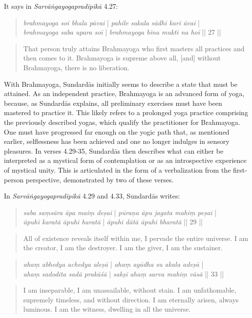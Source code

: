 It says in \textit{Sarvāṅgayogapradīpikā} 4.27:
\begin{quote}
\textit{brahmayoga soī bhala pāvai} | \textit{pahile sakala sādhi kari āvai} |\\
\textit{brahmayoga saba upara soī} | \textit{brahmayoga bina mukti na hoī} || 27 ||
\end{quote}
\begin{quote}
That person truly attains Brahmayoga who first masters all practices and then comes to it.  
Brahmayoga is supreme above all, [and] without Brahmayoga, there is no liberation.
\end{quote}

With Brahmayoga, Sundardās initially seems to describe a state that must be attained. As an independent practice, Brahmayoga is an advanced form of yoga, because, as Sundardās explains, all preliminary exercises must have been mastered to practice it. This likely refers to a prolonged yoga practice comprising the previously described yogas, which qualify the practitioner for Brahmayoga. One must have progressed far enough on the yogic path that, as mentioned earlier, selflessness has been achieved and one no longer indulges in sensory pleasures. In verses 4.29-35, Sundardās then describes what can either be interpreted as a mystical form of contemplation or as an introspective experience of mystical unity. This is articulated in the form of a verbalization from the first-person perspective, demonstrated by two of these verses.

In \textit{Sarvāṅgayogapradīpikā} 4.29 and 4.33, Sundardās writes:
\begin{quote}
\textit{saba saṃsāra āpa maiṃ deṣai} | \textit{pūraṇa āpu jagata mahiṃ peṣai} |\\
\textit{āpuhi karatā āpuhi haratā} | \textit{āpuhi dātā āpuhi bharatā} || 29 || 
\end{quote}
\begin{quote}
  All of existence reveals itself within me, I pervade the entire universe. 
  I am the creator, I am the destroyer. I am the giver, I am the sustainer.
\end{quote}
\begin{quote}
\textit{ahaṃ abhedya achedya aleṣā} | \textit{ahaṃ agādha su akala adeṣā} | \\
\textit{ahaṃ sadodita sadā prakāśā} | \textit{sakṣī ahaṃ sarva mahiṃ vāsā} || 33 ||
\end{quote}
\begin{quote}
  I am inseparable, I am unassailable, without stain. I am unfathomable, supremely timeless, and without direction.
  I am eternally arisen, always luminous. I am the witness, dwelling in all the universe.
\end{quote}

